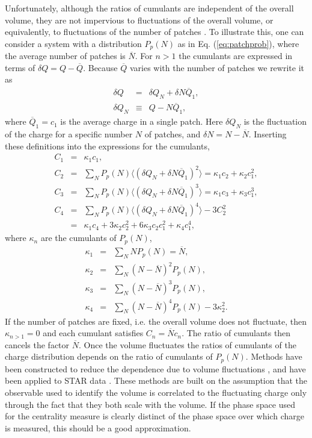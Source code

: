 Unfortunately, although the ratios of cumulants are independent of the overall volume, they are not impervious to fluctuations of the overall volume, or equivalently, to fluctuations of the number of patches \cite{Gazdzicki:1992ri,Gorenstein:2011vq,Gazdzicki:2013ana}. To illustrate this, one can consider a system with a distribution $P_p(N)$  as in Eq. (\ref{eq:patchprob}), where the average number of patches is $\overline{N}$. For $n>1$ the cumulants are expressed in terms of $\delta Q=Q-\overline{Q}$. Because $\overline{Q}$ varies with the number of patches we rewrite it as
\begin{eqnarray}
\delta Q&=&\delta Q_N+\delta N\overline{Q}_1,\\
\nonumber
\delta Q_N&\equiv&Q-N\overline{Q}_1,
\end{eqnarray}
where $\overline{Q}_1=c_1$ is the average charge in a single patch. Here $\delta Q_N$ is the fluctuation of the charge for a specific number $N$ of patches, and $\delta N=N-\overline{N}$. Inserting these definitions into the expressions for the cumulants,
\begin{eqnarray}\label{eq:volfluc}
C_1&=&\kappa_1c_1,\\
\nonumber
C_2&=&\sum_NP_p(N) \langle(\delta Q_N+\delta N\overline{Q}_1)^2\rangle=\kappa_1c_2+\kappa_2c_1^2,\\
\nonumber
C_3&=&\sum_NP_p(N) \langle(\delta Q_N+\delta N\overline{Q}_1)^3\rangle=\kappa_1c_3+\kappa_3c_1^3,\\
\nonumber
C_4&=&\sum_NP_p(N) \langle(\delta Q_N+\delta N\overline{Q}_1)^4\rangle-3C_2^2\\
\nonumber
&=&\kappa_1c_4+3\kappa_2c_2^2+6\kappa_3c_2c_1^2+\kappa_4c_1^4,
\end{eqnarray}
where $\kappa_n$ are the cumulants of $P_p(N)$,
\begin{eqnarray}\label{eq:kappadef2}
\kappa_1&=&\sum_N NP_p(N)=\overline{N},\\
\nonumber
\kappa_2&=&\sum_N (N-\overline{N})^2P_p(N),\\
\nonumber
\kappa_3&=&\sum_N (N-\overline{N})^3P_p(N),\\
\nonumber
\kappa_4&=&\sum_N (N-\overline{N})^4P_p(N)-3\kappa_2^2.
\end{eqnarray}
If the number of patches are fixed, i.e. the overall volume does not fluctuate, then $\kappa_{n>1}=0$ and each cumulant satisfies $C_n=\overline{N} c_n$. The ratio of cumulants then cancels the factor $\overline{N}$. 
Once the volume fluctuates the ratios of cumulants of the charge distribution depends on the ratio of cumulants of $P_p(N)$. Methods have been constructed to reduce the dependence due to volume fluctuations \cite{Begun:2014boa,Gazdzicki:2013ana,Gorenstein:2011vq,Sangaline:2015bma}, and have been applied to STAR data \cite{Luo:2017faz,Esumi:2020xdo}. These methods are built on the assumption that the observable used to identify the volume is correlated to the fluctuating charge only through the fact that they both scale with the volume. If the phase space used for the centrality measure is clearly distinct of the phase space over which charge is measured, this should be a good approximation. 

